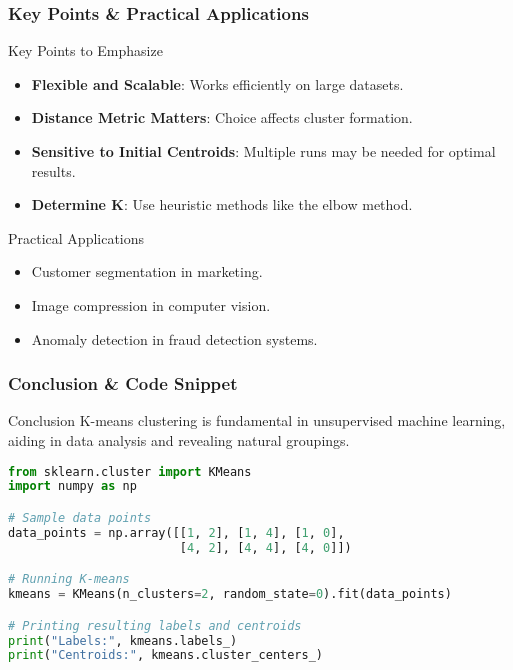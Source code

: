 \documentclass[aspectratio=169]{beamer}
\begin{document}
\begin{frame}[fragile]
    \frametitle{Key Points & Practical Applications}
    \begin{block}{Key Points to Emphasize}
        \begin{itemize}
            \item \textbf{Flexible and Scalable}: Works efficiently on large datasets.
            \item \textbf{Distance Metric Matters}: Choice affects cluster formation.
            \item \textbf{Sensitive to Initial Centroids}: Multiple runs may be needed for optimal results.
            \item \textbf{Determine K}: Use heuristic methods like the elbow method.
        \end{itemize}
    \end{block}

    \begin{block}{Practical Applications}
        \begin{itemize}
            \item Customer segmentation in marketing.
            \item Image compression in computer vision.
            \item Anomaly detection in fraud detection systems.
        \end{itemize}
    \end{block}
\end{frame}

\begin{frame}[fragile]
    \frametitle{Conclusion & Code Snippet}
    \begin{block}{Conclusion}
        K-means clustering is fundamental in unsupervised machine learning, aiding in data analysis and revealing natural groupings.
    \end{block}

    \begin{lstlisting}[language=Python, basicstyle=\ttfamily]
from sklearn.cluster import KMeans
import numpy as np

# Sample data points
data_points = np.array([[1, 2], [1, 4], [1, 0],
                        [4, 2], [4, 4], [4, 0]])

# Running K-means
kmeans = KMeans(n_clusters=2, random_state=0).fit(data_points)

# Printing resulting labels and centroids
print("Labels:", kmeans.labels_)
print("Centroids:", kmeans.cluster_centers_)
    \end{lstlisting}
\end{frame}
\end{document}

